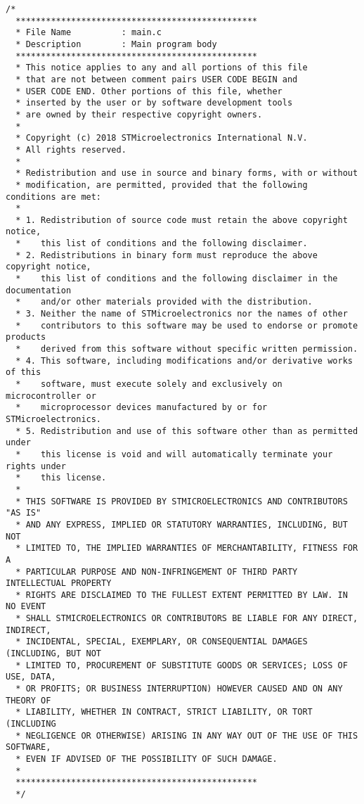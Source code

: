 \begin{lstlisting}[label=algoritmo:STM32F4:main.c,style = STM-code,frame=single,caption=STM32F4:main.c]
/* 
  ************************************************
  * File Name          : main.c
  * Description        : Main program body
  ************************************************
  * This notice applies to any and all portions of this file
  * that are not between comment pairs USER CODE BEGIN and
  * USER CODE END. Other portions of this file, whether 
  * inserted by the user or by software development tools
  * are owned by their respective copyright owners.
  *
  * Copyright (c) 2018 STMicroelectronics International N.V. 
  * All rights reserved.
  *
  * Redistribution and use in source and binary forms, with or without 
  * modification, are permitted, provided that the following conditions are met:
  *
  * 1. Redistribution of source code must retain the above copyright notice, 
  *    this list of conditions and the following disclaimer.
  * 2. Redistributions in binary form must reproduce the above copyright notice,
  *    this list of conditions and the following disclaimer in the documentation
  *    and/or other materials provided with the distribution.
  * 3. Neither the name of STMicroelectronics nor the names of other 
  *    contributors to this software may be used to endorse or promote products 
  *    derived from this software without specific written permission.
  * 4. This software, including modifications and/or derivative works of this 
  *    software, must execute solely and exclusively on microcontroller or
  *    microprocessor devices manufactured by or for STMicroelectronics.
  * 5. Redistribution and use of this software other than as permitted under 
  *    this license is void and will automatically terminate your rights under 
  *    this license. 
  *
  * THIS SOFTWARE IS PROVIDED BY STMICROELECTRONICS AND CONTRIBUTORS "AS IS" 
  * AND ANY EXPRESS, IMPLIED OR STATUTORY WARRANTIES, INCLUDING, BUT NOT 
  * LIMITED TO, THE IMPLIED WARRANTIES OF MERCHANTABILITY, FITNESS FOR A 
  * PARTICULAR PURPOSE AND NON-INFRINGEMENT OF THIRD PARTY INTELLECTUAL PROPERTY
  * RIGHTS ARE DISCLAIMED TO THE FULLEST EXTENT PERMITTED BY LAW. IN NO EVENT 
  * SHALL STMICROELECTRONICS OR CONTRIBUTORS BE LIABLE FOR ANY DIRECT, INDIRECT,
  * INCIDENTAL, SPECIAL, EXEMPLARY, OR CONSEQUENTIAL DAMAGES (INCLUDING, BUT NOT
  * LIMITED TO, PROCUREMENT OF SUBSTITUTE GOODS OR SERVICES; LOSS OF USE, DATA, 
  * OR PROFITS; OR BUSINESS INTERRUPTION) HOWEVER CAUSED AND ON ANY THEORY OF 
  * LIABILITY, WHETHER IN CONTRACT, STRICT LIABILITY, OR TORT (INCLUDING 
  * NEGLIGENCE OR OTHERWISE) ARISING IN ANY WAY OUT OF THE USE OF THIS SOFTWARE,
  * EVEN IF ADVISED OF THE POSSIBILITY OF SUCH DAMAGE.
  *
  ************************************************
  */


\end{lstlisting}
